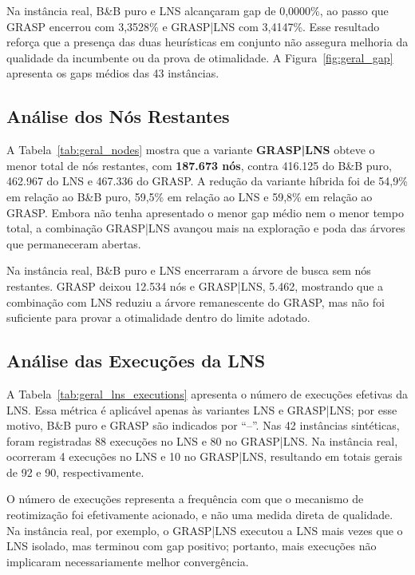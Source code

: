 



Na instância real, B\&B puro e LNS alcançaram gap de 0,0000\%, ao passo que GRASP encerrou com 3,3528\% e GRASP|LNS com 3,4147\%. Esse resultado reforça que a presença das duas heurísticas em conjunto não assegura melhoria da qualidade da incumbente ou da prova de otimalidade. A Figura~\ref{fig:geral_gap} apresenta os gaps médios das 43 instâncias.

\subsection{Análise dos Nós Restantes}

A Tabela~\ref{tab:geral_nodes} mostra que a variante \textbf{GRASP|LNS} obteve o menor total de nós restantes, com \textbf{187.673 nós}, contra 416.125 do B\&B puro, 462.967 do LNS e 467.336 do GRASP. A redução da variante híbrida foi de 54,9\% em relação ao B\&B puro, 59,5\% em relação ao LNS e 59,8\% em relação ao GRASP. Embora não tenha apresentado o menor gap médio nem o menor tempo total, a combinação GRASP|LNS avançou mais na exploração e poda das árvores que permaneceram abertas.





Na instância real, B\&B puro e LNS encerraram a árvore de busca sem nós restantes. GRASP deixou 12.534 nós e GRASP|LNS, 5.462, mostrando que a combinação com LNS reduziu a árvore remanescente do GRASP, mas não foi suficiente para provar a otimalidade dentro do limite adotado.

\subsection{Análise das Execuções da LNS}

A Tabela~\ref{tab:geral_lns_executions} apresenta o número de execuções efetivas da LNS. Essa métrica é aplicável apenas às variantes LNS e GRASP|LNS; por esse motivo, B\&B puro e GRASP são indicados por ``--''. Nas 42 instâncias sintéticas, foram registradas 88 execuções no LNS e 80 no GRASP|LNS. Na instância real, ocorreram 4 execuções no LNS e 10 no GRASP|LNS, resultando em totais gerais de 92 e 90, respectivamente.



O número de execuções representa a frequência com que o mecanismo de reotimização foi efetivamente acionado, e não uma medida direta de qualidade. Na instância real, por exemplo, o GRASP|LNS executou a LNS mais vezes que o LNS isolado, mas terminou com gap positivo; portanto, mais execuções não implicaram necessariamente melhor convergência.

